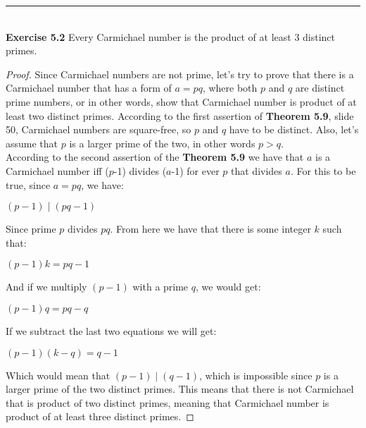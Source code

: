 \documentclass{article}
\begin{document}
\noindent\rule{12cm}{0.4pt}\\
\noindent \textbf{Exercise 5.2} Every Carmichael number is the product of at least 3 distinct primes.
\begin{proof}
Since Carmichael numbers are not prime, let's try to prove that there is a Carmichael number that has a form of $a=pq$, where both $p$ and $q$ are distinct prime numbers, or in other words, show that Carmichael number is product of at least two distinct primes. According to the first assertion of \textbf{Theorem 5.9}, slide 50, Carmichael numbers are square-free, so $p$ and $q$ have to be distinct. Also, let's assume that $p$ is a larger prime of the two, in other words $p > q$.\\
According to the second assertion of the \textbf{Theorem 5.9} we have that $a$ is a Carmichael number iff ($p$-1) divides ($a$-1) for ever $p$ that divides $a$. For this to be true, since $a = pq$, we have:
\begin{center}
$(p-1) \mid (pq - 1)$
\end{center}
Since prime $p$ divides $pq$. From here we have that there is some integer $k$ such that:
\begin{center}
$(p-1)k = pq - 1$
\end{center}
And if we multiply $(p-1)$ with a prime $q$, we would get:
\begin{center}
$(p-1)q = pq - q$
\end{center}
If we subtract the last two equations we will get:
\begin{center}
$(p-1)(k-q) = q - 1$
\end{center}
Which would mean that $(p-1) \mid (q-1)$, which is impossible since $p$ is a larger prime of the two distinct primes. This means that there is not Carmichael that is product of two distinct primes, meaning that Carmichael number is product of at least three distinct primes.
\end{proof}
\end{document}
